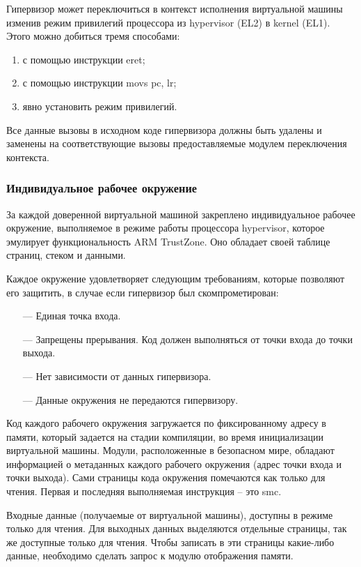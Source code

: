 Гипервизор может переключиться в контекст исполнения виртуальной машины изменив режим привилегий процессора из hypervisor (EL2) в kernel (EL1). Этого можно добиться тремя способами:

\begin{enumerate}[label*=\arabic*.]
	\item с помощью инструкции eret;
	\item с помощью инструкции movs pc, lr;
	\item явно установить режим привилегий.
\end{enumerate}

Все данные вызовы в исходном коде гипервизора должны быть удалены и заменены на соответствующие вызовы предоставляемые модулем переключения контекста.

\subsubsection{Индивидуальное рабочее окружение}

За каждой доверенной виртуальной машиной закреплено индивидуальное рабочее окружение, выполняемое в режиме работы процессора hypervisor, которое эмулирует функциональность ARM TrustZone. Оно обладает своей таблице страниц, стеком и данными.

Каждое окружение удовлетворяет следующим требованиям, которые позволяют его защитить, в случае если гипервизор был скомпрометирован:

\begin{itemize}
	\item [---] Единая точка входа.
	\item [---] Запрещены прерывания. Код должен выполняться от точки входа до точки выхода.
	\item [---] Нет зависимости от данных гипервизора.
	\item [---] Данные окружения не передаются гипервизору.
\end{itemize}

Код каждого рабочего окружения загружается по фиксированному адресу в памяти, который задается на стадии компиляции, во время инициализации виртуальной машины. Модули, расположенные в безопасном мире, обладают информацией о метаданных каждого рабочего окружения (адрес точки входа и точки выхода). Сами страницы кода окружения помечаются как только для чтения. Первая и последняя выполняемая инструкция -- это smc. 

Входные данные (получаемые от виртуальной машины), доступны в режиме только для чтения. Для выходных данных выделяются отдельные страницы, так же доступные только для чтения. Чтобы записать в эти страницы какие-либо данные, необходимо сделать запрос к модулю отображения памяти. 

